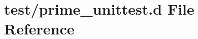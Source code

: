 \hypertarget{prime__unittest_8d}{\section{test/prime\-\_\-unittest.d \-File \-Reference}
\label{db/d22/prime__unittest_8d}
}
